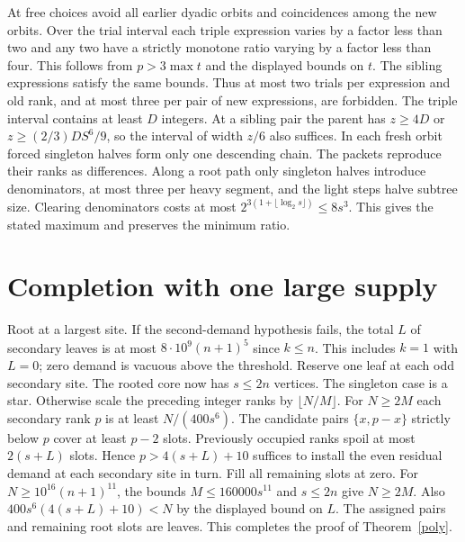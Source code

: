 At free choices avoid all earlier dyadic orbits and coincidences among
the new orbits. Over the trial interval each triple expression varies
by a factor less than two and any two have a strictly monotone ratio
varying by a factor less than four. This follows from $p>3\max t$ and
the displayed bounds on $t$. The sibling expressions satisfy the same
bounds. Thus at most two trials per expression and old rank, and at
most three per pair of new expressions, are forbidden. The triple
interval contains at least $D$ integers. At a sibling pair the parent
has $z\ge 4D$ or $z\ge(2/3)DS^6/9$, so the interval of width $z/6$
also suffices. In each fresh orbit forced singleton halves form only
one descending chain. The packets reproduce their ranks as differences.
Along a root path only singleton halves introduce denominators, at most
three per heavy segment, and the light steps halve subtree size.
Clearing denominators costs at most $2^{3(1+\lfloor\log_2s\rfloor)}
\le8s^3$. This gives the stated maximum and preserves the minimum ratio.

\section{Completion with one large supply}
Root at a largest site. If the second-demand hypothesis fails, the
total $L$ of secondary leaves is at most $8\cdot10^9(n+1)^5$ since $k\le n$.
This includes $k=1$ with $L=0$; zero demand is vacuous above the
threshold. Reserve one leaf at each odd secondary site. The rooted
core now has $s\le2n$ vertices. The singleton case is a star.
Otherwise scale the preceding integer ranks by $\lfloor N/M\rfloor$.
For $N\ge2M$ each secondary rank $p$ is at least $N/(400s^6)$.
The candidate pairs $\{x,p-x\}$ strictly below $p$ cover at least
$p-2$ slots. Previously occupied ranks spoil at most $2(s+L)$ slots.
Hence $p>4(s+L)+10$ suffices to install the even residual demand
at each secondary site in turn. Fill all remaining slots at zero.
For $N\ge10^{16}(n+1)^{11}$, the bounds $M\le160000s^{11}$ and
$s\le2n$ give $N\ge2M$. Also $400s^6(4(s+L)+10)<N$ by the displayed
bound on $L$. The assigned pairs and remaining root slots are leaves. This completes
the proof of Theorem~\ref{poly}.
